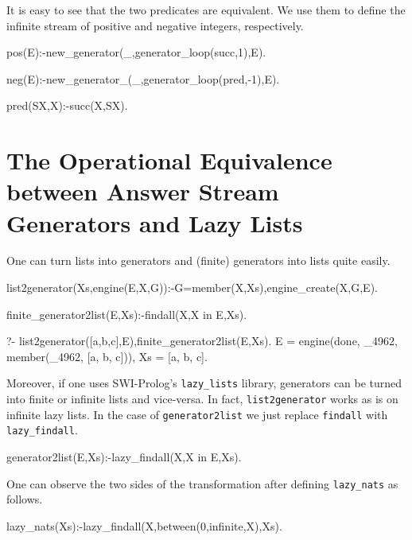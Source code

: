 \documentclass{new_tlp}
\begin{document}
It is easy to see that the two predicates are equivalent. We use
them to define the infinite stream of positive and negative 
integers, respectively.
\begin{code}
pos(E):-new_generator(_,generator_loop(succ,1),E).

neg(E):-new_generator_(_,generator_loop(pred,-1),E).

pred(SX,X):-succ(X,SX).
\end{code}


\section{The Operational Equivalence between Answer Stream Generators and Lazy Lists}

One can turn lists into generators and (finite) generators into lists quite easily.
\begin{code}
list2generator(Xs,engine(E,X,G)):-G=member(X,Xs),engine_create(X,G,E).

finite_generator2list(E,Xs):-findall(X,X in E,Xs).
\end{code}

\BX
\begin{codex}
?- list2generator([a,b,c],E),finite_generator2list(E,Xs).
E = engine(done, _4962, member(_4962, [a, b, c])),
Xs = [a, b, c].
\end{codex}
\EX

Moreover, if one uses SWI-Prolog's {\tt lazy\_lists} library, generators can be turned into finite or infinite lists and vice-versa.
In fact, {\tt list2generator} works as is on infinite lazy lists. In the case of {\tt generator2list} we just replace {\tt findall} with {\tt lazy\_findall}.
\begin{code}
generator2list(E,Xs):-lazy_findall(X,X in E,Xs).
\end{code} 

One can observe the two sides of the transformation after defining {\tt lazy\_nats} as follows.
\begin{code}
lazy_nats(Xs):-lazy_findall(X,between(0,infinite,X),Xs).
\end{code}
\end{document}
